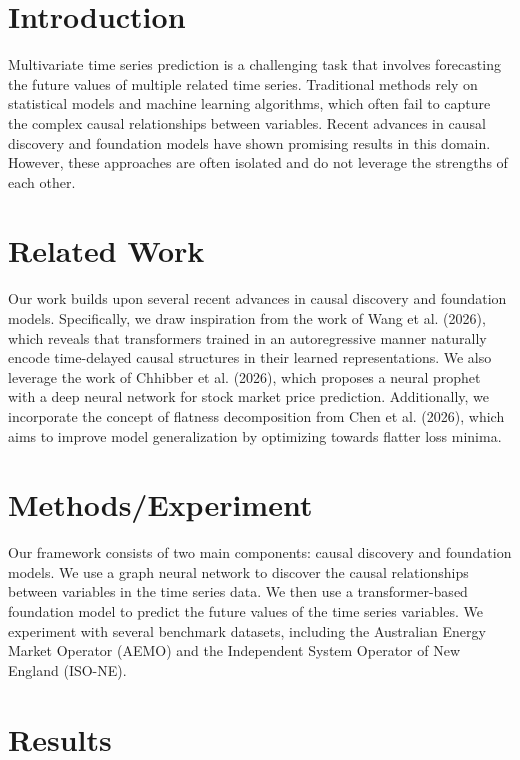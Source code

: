 \documentclass{article}
\begin{document}
        \section{Introduction}

        Multivariate time series prediction is a challenging task that involves forecasting the future values of multiple related time series. Traditional methods rely on statistical models and machine learning algorithms, which often fail to capture the complex causal relationships between variables. Recent advances in causal discovery and foundation models have shown promising results in this domain. However, these approaches are often isolated and do not leverage the strengths of each other.

        \section{Related Work}

        Our work builds upon several recent advances in causal discovery and foundation models. Specifically, we draw inspiration from the work of Wang et al. (2026), which reveals that transformers trained in an autoregressive manner naturally encode time-delayed causal structures in their learned representations. We also leverage the work of Chhibber et al. (2026), which proposes a neural prophet with a deep neural network for stock market price prediction. Additionally, we incorporate the concept of flatness decomposition from Chen et al. (2026), which aims to improve model generalization by optimizing towards flatter loss minima.

        \section{Methods/Experiment}

        Our framework consists of two main components: causal discovery and foundation models. We use a graph neural network to discover the causal relationships between variables in the time series data. We then use a transformer-based foundation model to predict the future values of the time series variables. We experiment with several benchmark datasets, including the Australian Energy Market Operator (AEMO) and the Independent System Operator of New England (ISO-NE).

        \section{Results}
\end{document}
